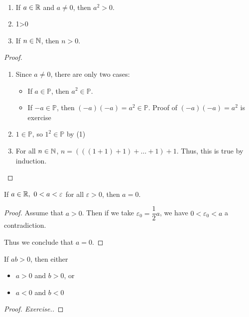 \documentclass[a4paper,12pt]{article}
\begin{document}
\begin{theorem}\ 
    \begin{enumerate}
        \item If \(a\in\mathbb{R}\) and \(a\neq 0\), then \(a^2>0\).
        \item 1>0
        \item If \(n\in\mathbb{N}\), then \(n>0\).
    \end{enumerate}
    \begin{proof}\ 
        \begin{enumerate}
            \item Since \(a\neq0\), there are only two cases: 
            \begin{itemize}
                \item If \(a\in\mathbb{P}\), then \(a^2\in\mathbb{P}\).
                \item If \(-a\in\mathbb{P}\), then \((-a)(-a)=a^2\in\mathbb{P}\). Proof of \((-a)(-a)=a^2\) is exercise
            \end{itemize}
            \item \(1\in\mathbb{P}\), so \(1^2\in\mathbb{P}\) by (1)
            \item For all \(n\in\mathbb{N}\), \(n=(((1+1)+1)+\dots+1)+1\). Thus, this is true by induction.
        \end{enumerate}
        
    \end{proof}
\end{theorem}

\begin{theorem}
    If \(a\in\mathbb{R},\ 0<a<\varepsilon\) for all \(\varepsilon>0\), then \(a=0\).
    \begin{proof}
        Assume that \(a>0\). Then if we take \(\varepsilon_0=\dfrac{1}{2}a\), we have \(0<\varepsilon_0<a\) a contradiction.
        
        Thus we conclude that \(a=0\).
    \end{proof}
\end{theorem}

\begin{theorem}
    If \(ab>0\), then either 
    \begin{itemize}
        \item \(a>0\) and \(b>0\), or 
        \item \(a<0\) and \(b<0\)
    \end{itemize}
    \begin{proof}[Proof. Exercise.]
        
    \end{proof}
\end{theorem}
\end{document}
